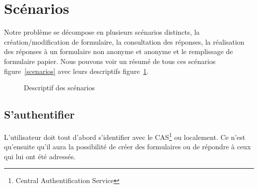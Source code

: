 \documentclass{sigplanconf}
\begin{document}
\section{Scénarios}\label{sec:scenarios}
Notre problème se décompose en plusieurs scénarios distincts, la création/modification de formulaire, la consultation des réponses, la réalisation des réponses à un formulaire non anonyme et anonyme et le remplissage de formulaire papier. Nous pouvons voir un résumé de tous ces scénarios figure~\ref{scenarios} avec leurs descriptifs figure~\ref{listScenarios}.
\begin{figure} %
\begin{center}
\end{center}
\caption{Descriptif des scénarios}
\label{listScenarios}
\end{figure}

\subsection{S'authentifier}
L’utilisateur doit tout d’abord s'identifier avec le CAS\footnote{Central Authentification Service} ou localement. Ce n'est qu'ensuite qu'il aura la possibilité de créer des formulaires ou de répondre à ceux qui lui ont été adressés.
\end{document}
